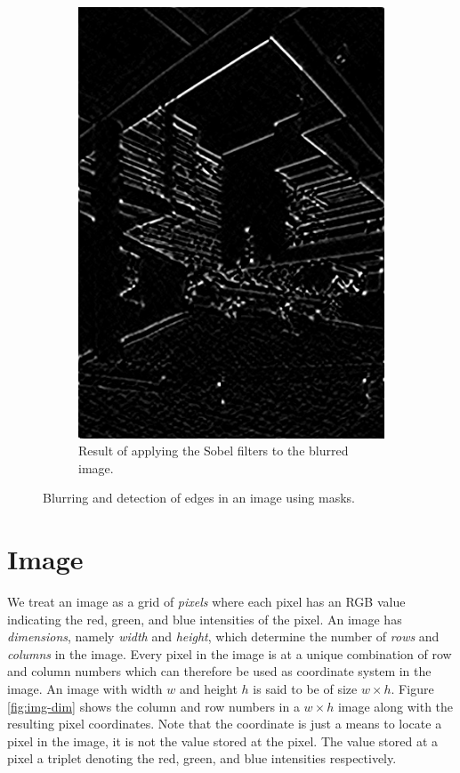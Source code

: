 \documentclass[addpoints]{exam}
\begin{document}
\begin{figure}
\begin{subfigure}[c]{.31\textwidth}
    \includegraphics[width=\textwidth]{campus-edge-detect}
    \caption{Result of applying the Sobel filters to the blurred image.}\label{fig:mask-edge}
  \end{subfigure}
  \caption{Blurring and detection of edges in an image using masks.}
  \label{fig:mask-apply}
\end{figure}

\section{Image}

We treat an image as a grid of \textit{pixels} where each pixel has an RGB value indicating the red, green, and blue intensities of the pixel. An image has \textit{dimensions}, namely \textit{width} and \textit{height}, which determine the number of \textit{rows} and \textit{columns} in the image. Every pixel in the image is at a unique combination of row and column numbers which can therefore be used as coordinate system in the image. An image with width $w$ and height $h$ is said to be of size $w\times h$. Figure \ref{fig:img-dim} shows the column and row numbers in a $w\times h$ image along with the resulting pixel coordinates. Note that the coordinate is just a means to locate a pixel in the image, it is not the value stored at the pixel. The value stored at a pixel a triplet denoting the red, green, and blue intensities respectively.
\end{document}
